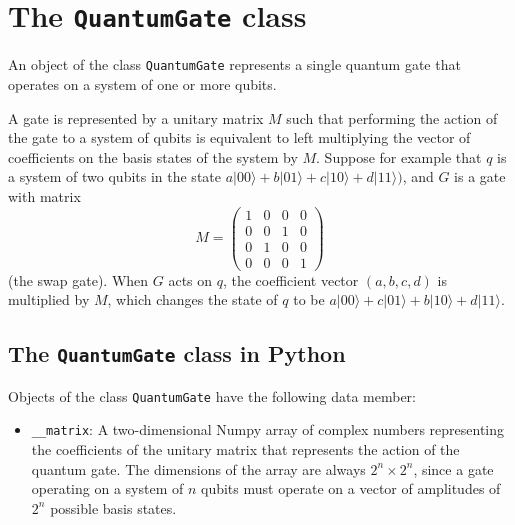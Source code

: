 \documentclass{article}
\begin{document}
\section{The \texttt{QuantumGate} class}

An object of the class \verb~QuantumGate~ represents a single quantum gate that operates on a system of one or more qubits. 

A gate is represented by a unitary matrix $M$ such that performing the action of the gate to a system of qubits is equivalent to left multiplying the vector of coefficients on the basis states of the system by $M$. Suppose for example that $q$ is a system of two qubits in the state $a|00\rangle + b|01\rangle + c|10\rangle + d|11\rangle)$, and $G$ is a gate with matrix
\[M = \left(\begin{array}{cccc} 
1 & 0 & 0 & 0 \\
0 & 0 & 1 & 0 \\ 
0 & 1 & 0 & 0 \\
0 & 0 & 0 & 1 
\end{array}\right) \] 
(the swap gate). When $G$ acts on $q$, the coefficient vector $(a, b, c, d)$ is multiplied by $M$, which changes the state of $q$ to be $a|00\rangle + c|01\rangle + b|10\rangle + d|11\rangle$. 

\subsection{The \texttt{QuantumGate} class in Python}

Objects of the class \verb~QuantumGate~ have the following data member: 
\begin{itemize} 
\item \verb~__matrix~: A two-dimensional Numpy array of complex numbers representing the coefficients of the unitary matrix that represents the action of the quantum gate. The dimensions of the array are always $2^n \times 2^n$, since a gate operating on a system of $n$ qubits must operate on a vector of amplitudes of $2^n$ possible basis states. 

\end{itemize} 
\end{document}
